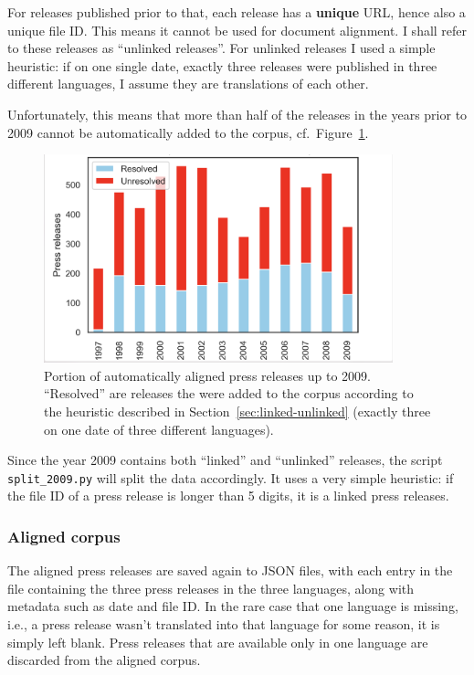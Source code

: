 For releases published prior to that, each release has a \textbf{unique} URL, hence also a unique file ID. 
This means it cannot be used for document alignment. 
I shall refer to these releases as \enquote{unlinked releases}.
For unlinked releases I used a simple heuristic: if on one single date, exactly three releases were published in three different languages, I assume they are translations of each other. 

Unfortunately, this means that more than half of the releases in the years prior to 2009 cannot be automatically added to the corpus, cf.~Figure~\ref{fig:linked-unlinked}.

\begin{figure}[h]
	\centering
	\includegraphics[width=0.9\textwidth]{graphics/linked-unlinked.png}
	\caption[Portion of automatically aligned press releases]{Portion of automatically aligned press releases up to 2009. 
	\enquote{Resolved} are releases the were added to the corpus according to the heuristic described in Section~\ref{sec:linked-unlinked} (exactly three on one date of three different languages).}
	\label{fig:linked-unlinked}
\end{figure}

Since the year 2009 contains both \enquote{linked} and \enquote{unlinked} releases, the script \linebreak \texttt{split\_2009.py}  will split the data accordingly. 
It uses a very simple heuristic: if the file ID of a press release is longer than 5 digits, it is a linked press releases.

\subsubsection{Aligned corpus}
The aligned press releases are saved again to \acrshort{JSON} files, with each entry in the file containing the three press releases in the three languages, along with metadata such as date and file ID. 
In the rare case that one language is missing, i.e., a press release wasn't translated into that language for some reason, it is simply left blank. 
Press releases that are available only in one language are discarded from the aligned corpus.

